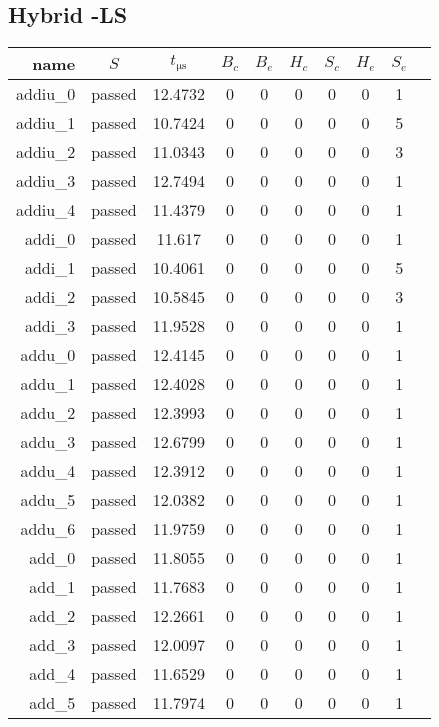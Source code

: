 \subsection{Hybrid -LS}
\begin{longtable}{r|ccccccccc}
    \toprule
    name & $S$ & $t_{\si{\micro\second}}$ & $B_c$ & $B_e$ & $H_c$ & $S_c$ & $H_e$ & $S_e$ \\
    \midrule
    \endhead

    addiu\_0 & passed & 12.4732 & 0 & 0 & 0 & 0 & 0 & 1 \\
    addiu\_1 & passed & 10.7424 & 0 & 0 & 0 & 0 & 0 & 5 \\
    addiu\_2 & passed & 11.0343 & 0 & 0 & 0 & 0 & 0 & 3 \\
    addiu\_3 & passed & 12.7494 & 0 & 0 & 0 & 0 & 0 & 1 \\
    addiu\_4 & passed & 11.4379 & 0 & 0 & 0 & 0 & 0 & 1 \\
    addi\_0 & passed & 11.617 & 0 & 0 & 0 & 0 & 0 & 1 \\  
    addi\_1 & passed & 10.4061 & 0 & 0 & 0 & 0 & 0 & 5 \\ 
    addi\_2 & passed & 10.5845 & 0 & 0 & 0 & 0 & 0 & 3 \\ 
    addi\_3 & passed & 11.9528 & 0 & 0 & 0 & 0 & 0 & 1 \\ 
    addu\_0 & passed & 12.4145 & 0 & 0 & 0 & 0 & 0 & 1 \\ 
    addu\_1 & passed & 12.4028 & 0 & 0 & 0 & 0 & 0 & 1 \\ 
    addu\_2 & passed & 12.3993 & 0 & 0 & 0 & 0 & 0 & 1 \\ 
    addu\_3 & passed & 12.6799 & 0 & 0 & 0 & 0 & 0 & 1 \\ 
    addu\_4 & passed & 12.3912 & 0 & 0 & 0 & 0 & 0 & 1 \\ 
    addu\_5 & passed & 12.0382 & 0 & 0 & 0 & 0 & 0 & 1 \\ 
    addu\_6 & passed & 11.9759 & 0 & 0 & 0 & 0 & 0 & 1 \\ 
    add\_0 & passed & 11.8055 & 0 & 0 & 0 & 0 & 0 & 1 \\  
    add\_1 & passed & 11.7683 & 0 & 0 & 0 & 0 & 0 & 1 \\  
    add\_2 & passed & 12.2661 & 0 & 0 & 0 & 0 & 0 & 1 \\  
    add\_3 & passed & 12.0097 & 0 & 0 & 0 & 0 & 0 & 1 \\  
    add\_4 & passed & 11.6529 & 0 & 0 & 0 & 0 & 0 & 1 \\
    add\_5 & passed & 11.7974 & 0 & 0 & 0 & 0 & 0 & 1 \\

\end{longtable}
